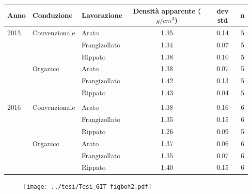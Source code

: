 \documentclass[10pt]{beamer}
\begin{document}
\begin{frame}[label=Core]

  \vspace{1.5cm}
  \hyperlink{densita}{}
  \footnotesize
  \begin{table}[ht]
    \centering
    \begin{tabular}{lllccc}
      \hline
      Anno & Conduzione & Lavorazione & Densit\`a apparente
                                        ($g/cm^3$) & dev std & n \\ 
      \hline
      2015 & Convenzionale & Arato & 1.35 & 0.14 &   5 \\ 
           &   & Frangizollato & 1.34 & 0.07 &   5 \\ 
           &   & Rippato & 1.38 & 0.10 &   5 \\ 
           & Organico & Arato & 1.38 & 0.07 &   5 \\ 
           &   & Frangizollato & 1.42 & 0.13 &   5 \\ 
           &   & Rippato & 1.43 & 0.04 &   5 \\ 
      \\
      2016 & Convenzionale & Arato & 1.38 & 0.16 &   6 \\ 
           &   & Frangizollato & 1.35 & 0.15 &   6 \\ 
           &   & Rippato & 1.26 & 0.09 &   5 \\ 
           & Organico & Arato & 1.37 & 0.06 &   6 \\ 
           &   & Frangizollato & 1.35 & 0.07 &   6 \\ 
           &   & Rippato & 1.40 & 0.15 &   6 \\ 
      \hline
    \end{tabular}
    \label{tab:RiassuntoDensitaCAmpo}
  \end{table}
\end{frame}

\begin{frame}
  \vspace{1.5cm}
  \begin{figure}
    \texttt{[image: ../tesi/Tesi\_GIT-figboh2.pdf]}
  \end{figure}
\end{frame}
\end{document}
